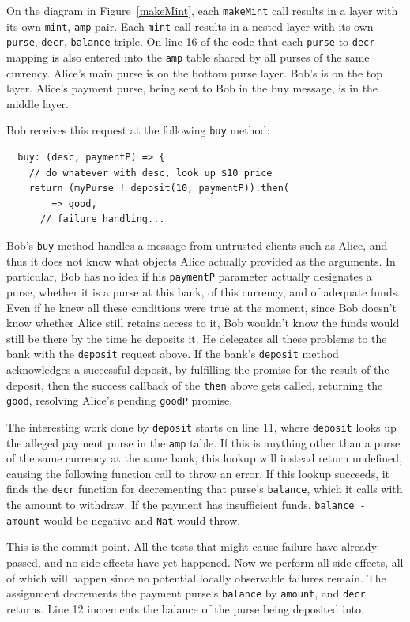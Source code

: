 \documentclass{llncs}
\begin{document}
On the diagram in Figure~\ref{makeMint}, each {\tt makeMint} call results in a layer with its own {\tt mint}, {\tt amp} pair. Each {\tt mint} call results in a nested layer with its own {\tt purse}, {\tt decr}, {\tt balance} triple. On line 16 of the code that each {\tt purse} to {\tt decr} mapping is also entered into the {\tt amp} table shared by all purses of the same currency. Alice's main purse is on the bottom purse layer. Bob's is on the top layer. Alice's payment purse, being sent to Bob in the buy message, is in the middle layer.

Bob receives this request at the following {\tt buy} method:

\begin{verbatim}
  buy: (desc, paymentP) => {
    // do whatever with desc, look up $10 price
    return (myPurse ! deposit(10, paymentP)).then(
      _ => good,
      // failure handling...
\end{verbatim}

Bob's {\tt buy} method handles a message from untrusted clients such as Alice, and thus it does not know what objects Alice actually provided as the arguments. In particular, Bob has no idea if his {\tt paymentP} parameter actually designates a purse, whether it is a purse at this bank, of this currency, and of adequate funds. Even if he knew all these conditions were true at the moment, since Bob doesn't know whether Alice still retains access to it, Bob wouldn't know the funds would still be there by the time he deposits it. He delegates all these problems to the bank with the {\tt deposit} request above. If the bank's {\tt deposit} method acknowledges a successful deposit, by fulfilling the promise for the result of the deposit, then the success callback of the {\tt then} above gets called, returning the {\tt good}, resolving Alice's pending {\tt goodP} promise.

The interesting work done by {\tt deposit} starts on line 11, where {\tt deposit} looks up the alleged payment purse in the {\tt amp} table. If this is anything other than a purse of the same currency at the same bank, this lookup will instead return undefined, causing the following function call to throw an error. If this lookup succeeds, it finds the {\tt decr} function for decrementing that purse's {\tt balance}, which it calls with the amount to withdraw. If the payment has insufficient funds, {\tt balance - amount} would be negative and {\tt Nat} would throw.

This is the commit point. All the tests that might cause failure have already passed, and no side effects have yet happened. Now we perform all side effects, all of which will happen since no potential locally observable failures remain.
The assignment decrements the payment purse's {\tt balance} by {\tt amount}, and {\tt decr} returns.
Line 12 increments the balance of the purse being deposited into.
\end{document}
